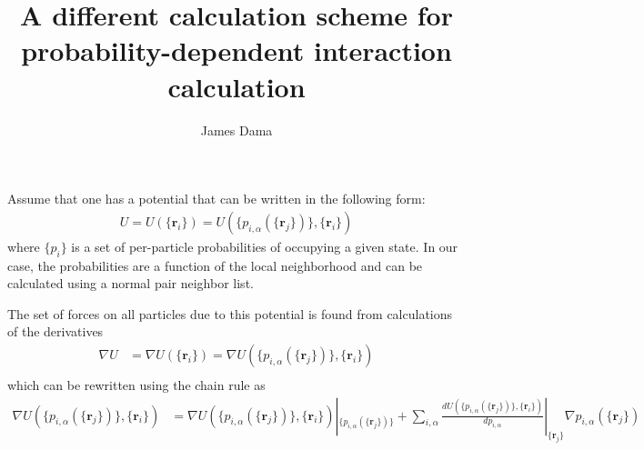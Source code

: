 \documentclass[11pt, oneside]{article}   	%
\title{A different calculation scheme for probability-dependent interaction calculation}
\author{James Dama}
\begin{document}
\maketitle

Assume that one has a potential that can be written in the following form:
\begin{align}
U =  U(\{\mathbf{r}_i\}) = U(\{p_{i, \alpha}(\{\mathbf{r}_j\})\}, \{\mathbf{r}_i\})
\end{align}
where $\{p_i\}$ is a set of per-particle probabilities of occupying a given state. In our case, the probabilities are a function of the local neighborhood and can be calculated using a normal pair neighbor list.

The set of forces on all particles due to this potential is found from calculations of the derivatives
\begin{align}
\nabla U &=  \nabla U(\{\mathbf{r}_i\}) = \nabla U(\{p_{i, \alpha}(\{\mathbf{r}_j\})\}, \{\mathbf{r}_i\}) \\
\end{align}
which can be rewritten using the chain rule as
\begin{align}
\nabla U(\{p_{i, \alpha}(\{\mathbf{r}_j\})\}, \{\mathbf{r}_i\}) &= \nabla U(\{p_{i, \alpha}(\{\mathbf{r}_j\})\}, \{\mathbf{r}_i\}) |_{\{p_{i, \alpha}(\{\mathbf{r}_j\})\}} + \sum_{i, \alpha} \frac{d U(\{p_{i, \alpha}(\{\mathbf{r}_j\})\}, \{\mathbf{r}_i\})}{d p_{i, \alpha}} |_{\{\mathbf{r}_j\}} \nabla p_{i, \alpha}(\{\mathbf{r}_j\})
\end{align}
\end{document}
